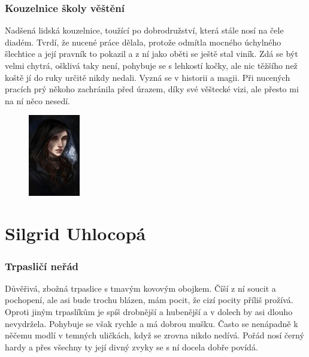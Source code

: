 \documentclass[letterpaper,onecolumn,openany,nodeprecatedcode]{dndbook}
\begin{document}
\subsubsection{Kouzelnice školy věštění}
Nadšená lidská kouzelnice, toužící po dobrodružství, která stále nosí na čele diadém. Tvrdí, že nucené práce dělala, protože odmítla mocného úchylného šlechtice a její pravník to pokazil a z ní jako oběti se ještě stal viník. Zdá se být velmi chytrá, ošklivá taky není, pohybuje se s lehkostí kočky, ale nic těžšího než koště jí do ruky určitě nikdy nedali. Vyzná se v historii a magii. Při nucených pracích prý někoho zachránila před úrazem, díky své věštecké vizi, ale přesto mi na ní něco nesedí.

\vspace{15 mm}

\begin{figure}
    \begin{center}
        \includegraphics[width=0.2\textwidth]{img/silgrid.jpg} 
    \end{center}
\end{figure}

\section{Silgrid Uhlocopá}
\subsubsection{Trpasličí neřád}
Důvěřivá, zbožná trpaslice s tmavým kovovým obojkem. Číší z ní soucit a pochopení, ale asi bude trochu blázen, mám pocit, že cizí pocity příliš prožívá. Oproti jiným trpaslíkům je spíš drobnější a hubenější a v dolech by asi dlouho nevydržela. Pohybuje se však rychle a má dobrou mušku. Často se nenápadně k něčemu modlí v temných uličkách, když se zrovna nikdo nedívá. Pořád nosí černý hardy a přes všechny ty její divný zvyky se s ní docela dobře povídá.

\vspace{20 mm}
\end{document}
